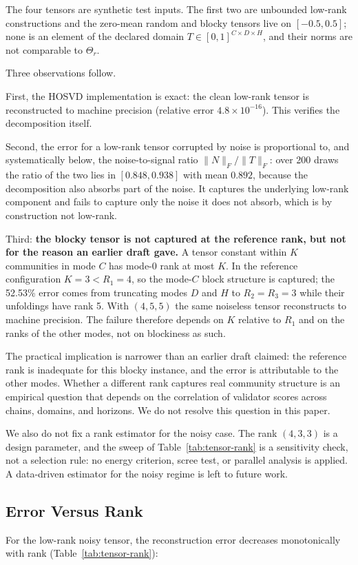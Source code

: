 \documentclass[11pt,a4paper]{article}
\numberwithin{equation}{section}
\numberwithin{table}{section}
\begin{document}
The four tensors are synthetic test inputs. The first two are unbounded low-rank constructions and the zero-mean random and blocky tensors live on $[-0.5,0.5]$; none is an element of the declared domain $T \in [0,1]^{C \times D \times H}$, and their norms are not comparable to $\Theta_r$.

Three observations follow.

First, the HOSVD implementation is exact: the clean low-rank tensor is reconstructed to machine precision (relative error $4.8 \times 10^{-16}$). This verifies the decomposition itself.

Second, the error for a low-rank tensor corrupted by noise is proportional to, and systematically below, the noise-to-signal ratio $\|N\|_F / \|T\|_F$: over 200 draws the ratio of the two lies in $[0.848, 0.938]$ with mean $0.892$, because the decomposition also absorbs part of the noise. It captures the underlying low-rank component and fails to capture only the noise it does not absorb, which is by construction not low-rank.

Third: \textbf{the blocky tensor is not captured at the reference rank, but not for the reason an earlier draft gave.} A tensor constant within $K$ communities in mode $C$ has mode-0 rank at most $K$. In the reference configuration $K=3<R_1=4$, so the mode-$C$ block structure is captured; the 52.53\% error comes from truncating modes $D$ and $H$ to $R_2=R_3=3$ while their unfoldings have rank 5. With $(4,5,5)$ the same noiseless tensor reconstructs to machine precision. The failure therefore depends on $K$ relative to $R_1$ and on the ranks of the other modes, not on blockiness as such.

The practical implication is narrower than an earlier draft claimed: the reference rank is inadequate for this blocky instance, and the error is attributable to the other modes. Whether a different rank captures real community structure is an empirical question that depends on the correlation of validator scores across chains, domains, and horizons. We do not resolve this question in this paper.

We also do not fix a rank estimator for the noisy case. The rank $(4,3,3)$ is a design parameter, and the sweep of Table~\ref{tab:tensor-rank} is a sensitivity check, not a selection rule: no energy criterion, scree test, or parallel analysis is applied. A data-driven estimator for the noisy regime is left to future work.

\subsection{Error Versus Rank}
For the low-rank noisy tensor, the reconstruction error decreases monotonically with rank (Table~\ref{tab:tensor-rank}):
\end{document}
